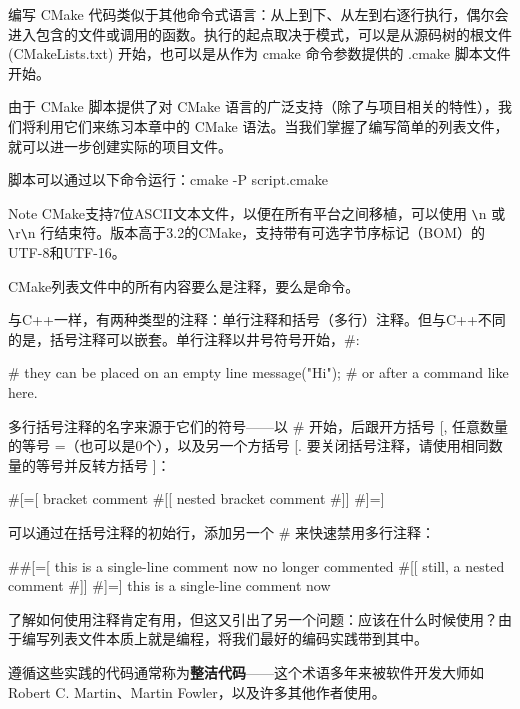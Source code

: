 编写 CMake 代码类似于其他命令式语言：从上到下、从左到右逐行执行，偶尔会进入包含的文件或调用的函数。执行的起点取决于模式，可以是从源码树的根文件 (CMakeLists.txt) 开始，也可以是从作为 cmake 命令参数提供的 .cmake 脚本文件开始。

由于 CMake 脚本提供了对 CMake 语言的广泛支持（除了与项目相关的特性），我们将利用它们来练习本章中的 CMake 语法。当我们掌握了编写简单的列表文件，就可以进一步创建实际的项目文件。

脚本可以通过以下命令运行：cmake -P script.cmake

\begin{myNotic}{Note}
CMake支持7位ASCII文本文件，以便在所有平台之间移植，可以使用 \verb|\|n 或 \verb|\|r\verb|\|n 行结束符。版本高于3.2的CMake，支持带有可选字节序标记（BOM）的UTF-8和UTF-16。

\end{myNotic}

CMake列表文件中的所有内容要么是注释，要么是命令。


与C++一样，有两种类型的注释：单行注释和括号（多行）注释。但与C++不同的是，括号注释可以嵌套。单行注释以井号符号开始，\#:

\begin{cmake}
# they can be placed on an empty line
message("Hi"); # or after a command like here.
\end{cmake}

多行括号注释的名字来源于它们的符号——以 \# 开始，后跟开方括号 [, 任意数量的等号 =（也可以是0个），以及另一个方括号 [. 要关闭括号注释，请使用相同数量的等号并反转方括号 ]：

\begin{cmake}
#[=[
bracket comment
  #[[
    nested bracket comment
  #]]
#]=]
\end{cmake}

可以通过在括号注释的初始行，添加另一个 \# 来快速禁用多行注释：

\begin{cmake}
##[=[ this is a single-line comment now
no longer commented
  #[[
    still, a nested comment
  #]]
#]=] this is a single-line comment now
\end{cmake}

了解如何使用注释肯定有用，但这又引出了另一个问题：应该在什么时候使用？由于编写列表文件本质上就是编程，将我们最好的编码实践带到其中。

遵循这些实践的代码通常称为\textbf{整洁代码}——这个术语多年来被软件开发大师如Robert C. Martin、Martin Fowler，以及许多其他作者使用。

